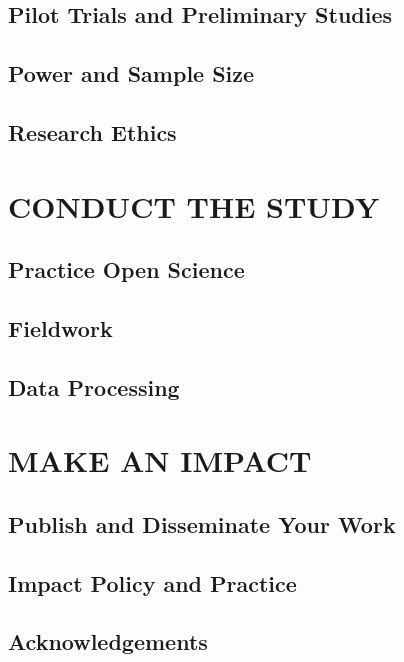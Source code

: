 \documentclass[justified,twoside,symmetric,]{tufte-book}
\begin{document}
\hypertarget{pilot}{%
\chapter{Pilot Trials and Preliminary Studies}\label{pilot}}

\hypertarget{power}{%
\chapter{Power and Sample Size}\label{power}}

\hypertarget{ethics}{%
\chapter{Research Ethics}\label{ethics}}

\hypertarget{part-conduct-the-study}{%
\part{CONDUCT THE STUDY}\label{part-conduct-the-study}}

\hypertarget{openscience}{%
\chapter{Practice Open Science}\label{openscience}}

\hypertarget{fieldwork}{%
\chapter{Fieldwork}\label{fieldwork}}

\hypertarget{data}{%
\chapter{Data Processing}\label{data}}

\hypertarget{part-make-an-impact}{%
\part{MAKE AN IMPACT}\label{part-make-an-impact}}

\hypertarget{dissemination}{%
\chapter{Publish and Disseminate Your Work}\label{dissemination}}

\hypertarget{policy}{%
\chapter{Impact Policy and Practice}\label{policy}}

\hypertarget{acknowledgements}{%
\chapter*{Acknowledgements}\label{acknowledgements}}


\end{document}
